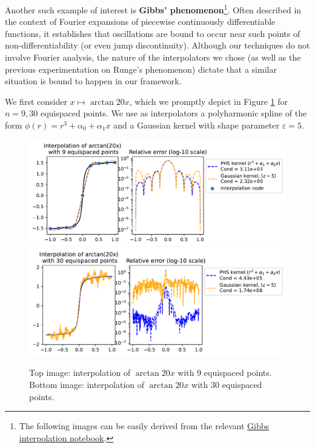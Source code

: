 \documentclass[12pt]{report} %
\begin{document}

Another such example of interest is \textbf{Gibbs' phenomenon}\footnote{The following images can be easily derived from the relevant \href{https://github.com/heqro/tfm-experiments/blob/main/introductory_notebooks/rbf_interpolation/gibbs_rbf_and_phs.ipynb}{Gibbs interpolation notebook}.}. Often described in the context of Fourier expansions of piecewise continuously differentiable functions, it establishes that oscillations are bound to occur near such points of non-differentiability (or even jump discontinuity).
Although our techniques do not involve Fourier analysis, the nature of the interpolators we chose (as well as the previous experimentation on Runge's phenomenon) dictate that a similar situation is bound to happen in our framework.

We first consider $x \mapsto \arctan{20x}$, which we promptly depict in Figure \ref{fig:arctan-with-points} for $n=9, 30$ equispaced points. We use as interpolators a polyharmonic spline of the form $\phi(r) = r^3+\alpha_0+\alpha_1 x$ and a Gaussian kernel with shape parameter $\varepsilon=5$.

\begin{figure}[ht]
  \centering
  \includegraphics[width=\textwidth]{imagenes/experiments/1d/intro/arctan-with-9-pts.pdf}
  \includegraphics[width=\textwidth]{imagenes/experiments/1d/intro/arctan-with-30-pts.pdf}
  \caption{Top image: interpolation of $\arctan{20x}$ with 9 equispaced points. Bottom image: interpolation of $\arctan{20x}$ with 30 equispaced points. }
  \label{fig:arctan-with-points}
\end{figure}
\end{document}
